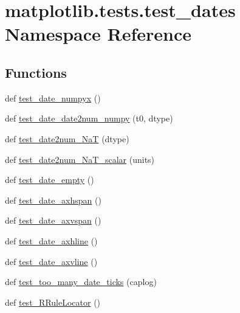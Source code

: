 \hypertarget{namespacematplotlib_1_1tests_1_1test__dates}{}\section{matplotlib.\+tests.\+test\+\_\+dates Namespace Reference}
\label{namespacematplotlib_1_1tests_1_1test__dates}
\subsection*{Functions}
\begin{DoxyCompactItemize}
\item 
def \hyperlink{namespacematplotlib_1_1tests_1_1test__dates_a03b3eaa2589d27f9a034aa96e661dfb9}{test\+\_\+date\+\_\+numpyx} ()
\item 
def \hyperlink{namespacematplotlib_1_1tests_1_1test__dates_ad9dbc81c90d6f30632a2a092aff80b8d}{test\+\_\+date\+\_\+date2num\+\_\+numpy} (t0, dtype)
\item 
def \hyperlink{namespacematplotlib_1_1tests_1_1test__dates_ab97112240c4e5c080fc4b57a89e18b68}{test\+\_\+date2num\+\_\+\+NaT} (dtype)
\item 
def \hyperlink{namespacematplotlib_1_1tests_1_1test__dates_a0ae658e1311a4ed163388f5de14fa78a}{test\+\_\+date2num\+\_\+\+Na\+T\+\_\+scalar} (units)
\item 
def \hyperlink{namespacematplotlib_1_1tests_1_1test__dates_a2723e9cd8495b396908cdc7a19a2b310}{test\+\_\+date\+\_\+empty} ()
\item 
def \hyperlink{namespacematplotlib_1_1tests_1_1test__dates_a63278e5f1aa54c026172b5e813d3e2cc}{test\+\_\+date\+\_\+axhspan} ()
\item 
def \hyperlink{namespacematplotlib_1_1tests_1_1test__dates_a089717253c97241879f63678c3de298f}{test\+\_\+date\+\_\+axvspan} ()
\item 
def \hyperlink{namespacematplotlib_1_1tests_1_1test__dates_a093f9e01d8ab06675e0965999dfb771e}{test\+\_\+date\+\_\+axhline} ()
\item 
def \hyperlink{namespacematplotlib_1_1tests_1_1test__dates_a890a7ca401958a329d378a11868f9652}{test\+\_\+date\+\_\+axvline} ()
\item 
def \hyperlink{namespacematplotlib_1_1tests_1_1test__dates_a154c0c9cf5cbba105773d28a523d6a0c}{test\+\_\+too\+\_\+many\+\_\+date\+\_\+ticks} (caplog)
\item 
def \hyperlink{namespacematplotlib_1_1tests_1_1test__dates_a7ff831814e5aab4103a8d4c20315efff}{test\+\_\+\+R\+Rule\+Locator} ()

\end{DoxyCompactItemize}
